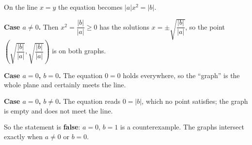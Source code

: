 On the line $x=y$ the equation becomes $|a|x^2=|b|$.

\textbf{Case $a\ne0$.} Then $x^2=\dfrac{|b|}{|a|}\ge0$ has the solutions $x=\pm\sqrt{\dfrac{|b|}{|a|}}$, so the point $\left(\sqrt{\dfrac{|b|}{|a|}},\sqrt{\dfrac{|b|}{|a|}}\right)$ is on both graphs.

\textbf{Case $a=0$, $b=0$.} The equation $0=0$ holds everywhere, so the ``graph'' is the whole plane and certainly meets the line.

\textbf{Case $a=0$, $b\ne0$.} The equation reads $0=|b|$, which no point satisfies; the graph is empty and does not meet the line.

So the statement is \textbf{false}: $a=0$, $b=1$ is a counterexample. The graphs intersect exactly when $\boxed{a\ne0\text{ or }b=0}$.
